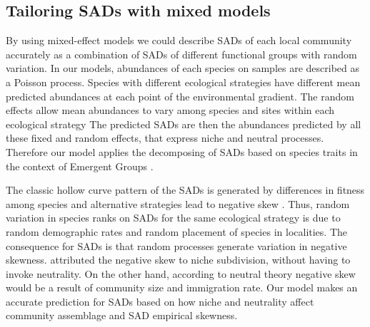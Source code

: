 \documentclass[12pt]{article}
\begin{document}
\subsection*{Tailoring SADs with mixed models} 

By using mixed-effect models we could describe SADs of each local
community accurately as a combination
of SADs of different functional groups with random variation.
In our models, abundances of each species on samples are described as a
Poisson process. Species with different ecological strategies have
different mean predicted abundances at each point of the environmental
gradient. The random effects allow
mean abundances to vary among species and sites within each ecological
strategy %
The predicted SADs are then the
abundances predicted 
by all these fixed and random effects, that express niche and neutral
processes. %
Therefore our model applies the  
decomposing of SADs based on species traits \citep{Magurran2003} in
the context of Emergent Groups \citep{Herault2007}.

The classic hollow curve pattern of the SADs is generated by differences in fitness among species and alternative strategies lead to negative skew \citep{Magurran2003}. 
Thus, random variation in species ranks on SADs for the same ecological strategy is due to random demographic rates and random placement of species in localities. 
The consequence for SADs is that random processes generate variation in negative skewness. \cite{Magurran2003} attributed the negative skew to niche subdivision, without having to invoke neutrality. On the other hand, according to neutral theory \citep{Hubbell2001} negative skew would be a result of community size and immigration rate. Our model makes an accurate prediction for SADs based on how niche and neutrality affect community assemblage and SAD empirical skewness.
\end{document}
